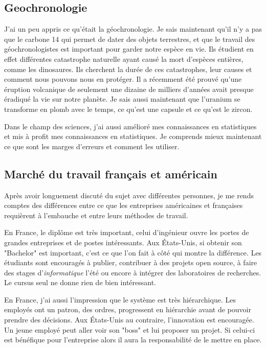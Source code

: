\subsection{Geochronologie}
J'ai un peu appris ce qu'était la géochronologie. Je sais maintenant qu'il n'y a pas que le carbone 14 qui permet de dater des objets terrestres, et que le travail des géochronologistes est important pour garder notre espèce en vie. Ils étudient en effet différentes catastrophe naturelle ayant causé la mort d'espèces entières, comme les dinosaures. Ils cherchent la durée de ces catastrophes, leur causes et comment nous pouvons nous en protéger. Il a récemment été prouvé qu'une éruption volcanique de seulement une dizaine de milliers d'années avait presque éradiqué la vie sur notre planète.
Je sais aussi maintenant que l'uranium se transforme en plomb avec le temps, ce qu'est une capsule et ce qu'est le zircon.

Dans le champ des sciences, j'ai aussi amélioré mes connaissances en statistiques et mis à profit mes connaissances en statistiques. Je comprends mieux maintenant ce que sont les marges d'erreurs et comment les utiliser.

\subsection{Marché du travail français et américain}
Après avoir longuement discuté du sujet avec différentes personnes, je me rends comptes des différences entre ce que les entreprises américaines et françaises requièrent à l'embauche et entre leurs méthodes de travail. 

En France, le diplôme est très important, celui d'ingénieur ouvre les portes de grandes entreprises et de postes intéressants. Aux États-Unis, si obtenir son "Bachelor" est important, c'est ce que l'on fait à côté qui montre la différence. Les étudiants sont encouragés à publier, contribuer à des projets open source, à faire des stages d'\emph{informatique} l'été ou encore à intégrer des laboratoires de recherches. Le cursus seul ne donne rien de bien intéressant.

En France, j'ai aussi l'impression que le système est très hiérarchique. Les employés ont un patron, des ordres, progressent en hiérarchie avant de pouvoir prendre des décisions. Aux États-Unis au contraire, l'innovation est encouragée. Un jeune employé peut aller voir son "boss" et lui proposer un projet. Si celui-ci est bénéfique pour l'entreprise alors il aura la responsabilité de le mettre en place. 

